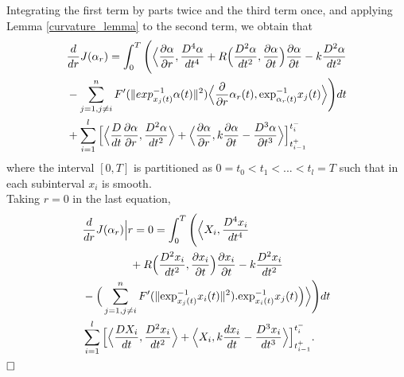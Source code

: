 \documentclass[letterpaper, 10 pt, conference]{ieeeconf}  %
\begin{document}
Integrating the first term by parts twice and the third term once, and applying Lemma \ref{curvature_lemma} to the second term, we obtain that
\begin{equation*}
\begin{split}
& \frac{d}{dr}J(\alpha_r) = \int_0^T \Bigg( \Big \langle \frac{\partial \alpha}{\partial r}, \frac{D^4\alpha}{dt^4} + R \Big( \frac{D^2\alpha}{dt^2}, \frac{\partial \alpha}{\partial t} \Big) \frac{\partial \alpha}{\partial t} - k\frac{D^2\alpha}{dt^2} \\ &- \sum\limits_{j=1, j \neq i}^{n} F'(\| exp^{-1}_{x_{j}(t)}\alpha(t)\|^2)\Big \langle  \frac{\partial}{\partial r}\alpha_r(t), \hbox{exp}^{-1}_{\alpha_r(t)}x_j(t) \Big \rangle \Bigg) dt \\ &+ \sum_{i=1}^{l} \Big{[} \Big \langle \frac{D}{dt}\frac{\partial \alpha}{\partial r},\frac{D^2\alpha}{dt^2} \Big \rangle + \Big \langle \frac{\partial \alpha}{\partial r}, k \frac{\partial \alpha}{\partial t} - \frac{D^3\alpha}{\partial t^3} \Big \rangle\Big{]}^{t_{i}^{-}}_{t_{i-1}^{+}}
\end{split}
\end{equation*}
where the interval $[0,T]$ is partitioned as $ 0 = t_0 < t_1 < ...< t_l = T $ such that in each subinterval $x_i$ is smooth. \\
Taking $r = 0$ in the last equation, \\
\begin{align*}
& \frac{d}{dr}J(\alpha_r)\Big{|}{r=0} = \int_0^T \Bigg( \Big \langle X_i, \frac{D^4x_i}{dt^4} \\&\hspace{1.5cm}+ R \Big( \frac{D^2x_i}{dt^2}, \frac{\partial x_i}{\partial t} \Big) \frac{\partial x_i}{\partial t}  - k\frac{D^2x_i}{dt^2} \\ & - \Big( \sum\limits_{j=1, j \neq i}^{n} F'(\| \hbox{exp}^{-1}_{x_{j}(t)}x_i(t)\|^2). \hbox{exp}^{-1}_{x_i(t)}x_j(t) \Big)  \Big \rangle \Bigg) dt \\ & \sum_{i=1}^{l} \Big{[} \Big \langle \frac{DX_i}{dt},\frac{D^2x_i}{dt^2} \Big \rangle + \Big \langle X_i, k \frac{dx_i}{dt} - \frac{D^3x_i}{dt^3} \Big \rangle\Big{]}^{t_{i}^{-}}_{t_{i-1}^{+}}. 
\end{align*}$\hfill\square$
%
%
\end{document}
